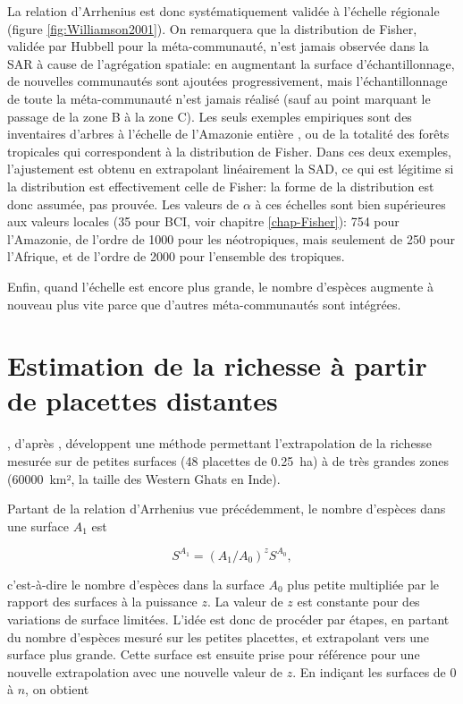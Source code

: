 \documentclass[
  11pt,
  french,
  a4paper,
  extrafontsizes,onecolumn,openright
  ]{memoir}
\newlength{\rf}
\begin{document}
La relation d'Arrhenius est donc systématiquement validée à l'échelle régionale (figure \ref{fig:Williamson2001}).
On remarquera que la distribution de Fisher, validée par Hubbell pour la méta-communauté, n'est jamais observée dans la SAR à cause de l'agrégation spatiale: en augmentant la surface d'échantillonnage, de nouvelles communautés sont ajoutées progressivement, mais l'échantillonnage de toute la méta-communauté n'est jamais réalisé (sauf au point marquant le passage de la zone B à la zone C).
Les seuls exemples empiriques sont des inventaires d'arbres à l'échelle de l'Amazonie entière \autocite{TerSteege2013}, ou de la totalité des forêts tropicales \autocite{Slik2015} qui correspondent à la distribution de Fisher. Dans ces deux exemples, l'ajustement est obtenu en extrapolant linéairement la SAD, ce qui est légitime \autocite{Izsak2012} si la distribution est effectivement celle de Fisher: la forme de la distribution est donc assumée, pas prouvée.
Les valeurs de \(\alpha\) à ces échelles sont bien supérieures aux valeurs locales (35 pour BCI, voir chapitre \ref{chap-Fisher}): 754 pour l'Amazonie, de l'ordre de 1000 pour les néotropiques, mais seulement de 250 pour l'Afrique, et de l'ordre de 2000 pour l'ensemble des tropiques.

Enfin, quand l'échelle est encore plus grande, le nombre d'espèces augmente à nouveau plus vite parce que d'autres méta-communautés sont intégrées.

\hypertarget{estimation-de-la-richesse-uxe0-partir-de-placettes-distantes}{%
\section{Estimation de la richesse à partir de placettes distantes}\label{estimation-de-la-richesse-uxe0-partir-de-placettes-distantes}}

\textcite{Krishnamani2004}, d'après \textcite{Harte1999}, développent une méthode permettant l'extrapolation de la richesse mesurée sur de petites surfaces (48 placettes de 0.25~ha) à de très grandes zones (60000~km², la taille des Western Ghats en Inde).

Partant de la relation d'Arrhenius vue précédemment, le nombre d'espèces dans une surface \(A_1\) est

\begin{equation}
  \label{eq:NsA1}
  S^{A_1} = \left({A_1}/{A_0}\right)^z{S^{A_0}},
\end{equation}

c'est-à-dire le nombre d'espèces dans la surface \(A_0\) plus petite multipliée par le rapport des surfaces à la puissance \(z\).
La valeur de \(z\) est constante pour des variations de surface limitées.
L'idée est donc de procéder par étapes, en partant du nombre d'espèces mesuré sur les petites placettes, et extrapolant vers une surface plus grande.
Cette surface est ensuite prise pour référence pour une nouvelle extrapolation avec une nouvelle valeur de \(z\).
En indiçant les surfaces de 0 à \(n\), on obtient
\end{document}
